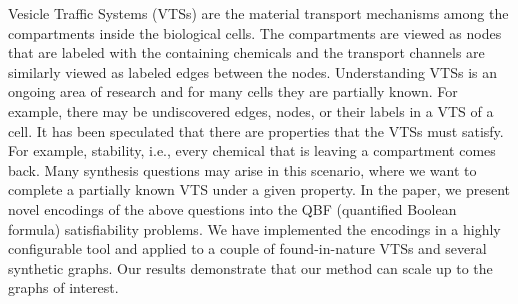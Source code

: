 Vesicle Traffic Systems (VTSs) are the material transport 
mechanisms among the compartments inside the biological cells.
%
The compartments are viewed as nodes that are labeled with the
containing chemicals and the transport channels
are similarly viewed as labeled edges between the nodes.
%
Understanding VTSs is an ongoing area of research and for many cells
they are partially known.
%
For example, there may be undiscovered edges, nodes, or their labels
in a VTS of a cell.
%
It has been speculated that there are properties that the VTSs must
satisfy.
%
For example, stability, i.e., every chemical that is leaving a
compartment comes back.
%
Many synthesis questions may arise in this scenario, where we want
to complete a partially known VTS under a given property.
%
In the paper, we present novel encodings of the above questions
into the QBF (quantified Boolean formula) satisfiability problems.
%
We have implemented the encodings in a highly configurable tool
and applied to a couple of found-in-nature VTSs and 
several synthetic graphs.
%
Our results demonstrate that our method can scale up to the graphs of interest.


